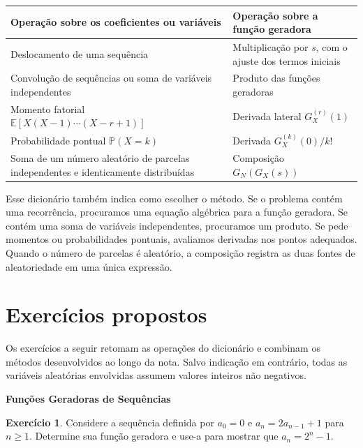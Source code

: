 \documentclass[12pt,portuguese]{article}
\theoremstyle{definition}
\theoremstyle{plainexercise}
\newtheorem{exercise}{Exercício}
\theoremstyle{starredexercise}
\theoremstyle{definition}
\begin{document}
\begin{center}
\renewcommand{\arraystretch}{1.35}
\setlength{\tabcolsep}{8pt}
\begin{tabular}{@{}p{}p{}@{}}
\toprule
Operação sobre os coeficientes ou variáveis & Operação sobre a função geradora \\
\midrule
Deslocamento de uma sequência & Multiplicação por $s$, com o ajuste dos termos iniciais \\
Convolução de sequências ou soma de variáveis independentes & Produto das funções geradoras \\
Momento fatorial $\mathbb{E}[X(X-1)\cdots(X-r+1)]$ & Derivada lateral $G_X^{(r)}(1)$ \\
Probabilidade pontual $\mathbb{P}(X=k)$ & Derivada $G_X^{(k)}(0)/k!$ \\
Soma de um número aleatório de parcelas independentes e identicamente distribuídas & Composição $G_N(G_X(s))$ \\
\bottomrule
\end{tabular}
\end{center}

Esse dicionário também indica como escolher o método. Se o problema contém
uma recorrência, procuramos uma equação algébrica para a função geradora. Se
contém uma soma de variáveis independentes, procuramos um produto. Se pede
momentos ou probabilidades pontuais, avaliamos derivadas nos pontos adequados.
Quando o número de parcelas é aleatório, a composição registra as duas fontes
de aleatoriedade em uma única expressão.


\section{Exercícios propostos}
\label{sec:exercicios-funcoes-geradoras}

Os exercícios a seguir retomam as operações do dicionário e combinam os
métodos desenvolvidos ao longo da nota. Salvo indicação em contrário, todas
as variáveis aleatórias envolvidas assumem valores inteiros não negativos.

\medskip
\noindent\textbf{Funções Geradoras de Sequências}

\begin{exercise}\label{ex:rec-linear-2}
Considere a sequência definida por $a_0=0$ e
$a_n=2a_{n-1}+1$ para $n\geqslant 1$. Determine sua função geradora e use-a
para mostrar que $a_n=2^n-1$.
\end{exercise}
\end{document}
